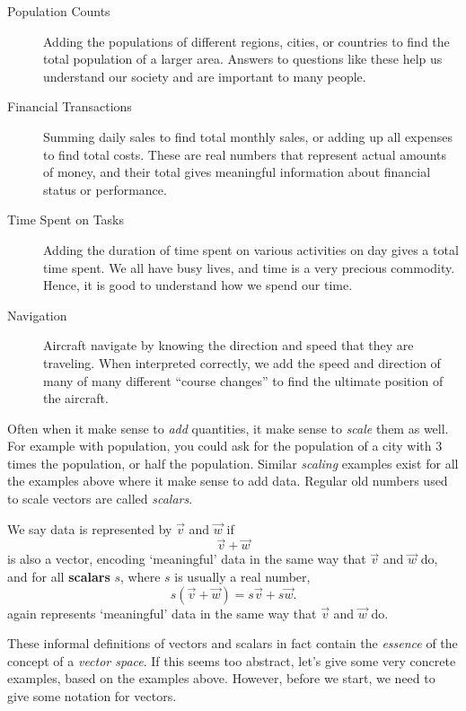 \documentclass{ximera}
\begin{document}
\begin{concept}
\begin{description}
\item[Population Counts] Adding the populations of different regions,
  cities, or countries to find the total population of a larger
  area. Answers to questions like these help us understand our
  society and are important to many people.
\item[Financial Transactions] Summing daily sales to find total
  monthly sales, or adding up all expenses to find total costs. These
  are real numbers that represent actual amounts of money, and their
  total gives meaningful information about financial status or
  performance.
\item[Time Spent on Tasks] Adding the duration of time spent on
  various activities on day gives a total time spent. We all have busy
  lives, and time is a very precious commodity. Hence, it is good to
  understand how we spend our time.
\item[Navigation] Aircraft navigate by knowing the direction and speed
  that they are traveling. When interpreted correctly, we add the
  speed and direction of many of many different ``course changes'' to
  find the ultimate position of the aircraft.
\end{description}
\end{concept}
Often when it make sense to \textit{add} quantities, it make sense to
\textit{scale} them as well. For example with population, you could
ask for the population of a city with $3$ times the population, or
half the population. Similar \textit{scaling} examples exist for all
the examples above where it make sense to add data. Regular old
numbers used to scale vectors are called \textit{scalars}.


\begin{definition}
  We say data is represented by  $\vec{v}$ and $\vec{w}$
  if
  \[
  \vec{v}+\vec{w}
  \]
  is also a vector, encoding `meaningful' data in the same way that
  $\vec{v}$ and $\vec{w}$ do, and for all \textbf{scalars} $s$, where
  $s$ is usually a real number,
  \[
  s(\vec{v} + \vec{w}) = s\vec{v}+ s\vec{w}.
  \]
  again represents `meaningful' data in the same way that $\vec{v}$
  and $\vec{w}$ do.
\end{definition}
These informal definitions of vectors and scalars in fact contain the
\textit{essence} of the concept of a \textit{vector space}. If this
seems too abstract, let's give some very concrete examples, based on
the examples above. However, before we start, we need to give some
notation for vectors.
\end{document}
